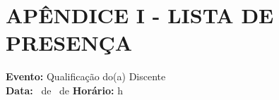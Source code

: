 {\begin{center}
    \signature[Nome do Aluno]{\nomeAluno}
\end{center}

\vspace{-1.0cm}
\begin{center}
    \signature[Nome do Orientador]{\nomeOrientador}\hfill\signature[Nome do Coorientador]{\nomeCoorientador}\\
    \signature[Professor(a) da banca]{\nomeBancaA}\hfill\signature[Professor(a) da banca]{\nomeBancaB}
\end{center}
}

\newpage
\section*{APÊNDICE I - LISTA DE PRESENÇA}
\label{sec:listPresenca}
\noindent
\textbf{Evento:} Qualificação do(a) Discente \nomeAluno \\
\textbf{Data:} \diaDefesa~de \mesExtensoDefesa~de \anoDefesa \quad
\textbf{Horário:} \horaDefesa h\minutosDefesa \quad

\vspace{1cm}

